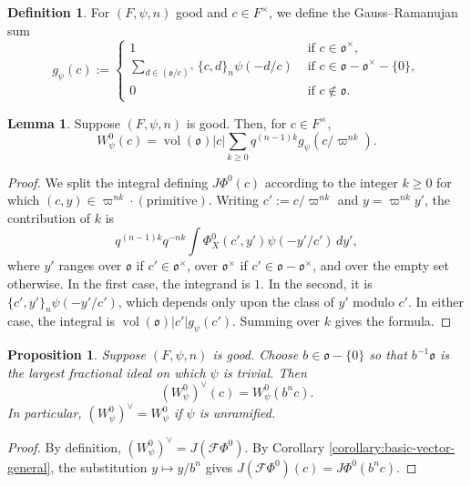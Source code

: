\documentclass[reqno]{amsart}
\DeclareMathOperator{\vol}{vol}
\theoremstyle{plain}
\newtheorem{proposition}[theorem]{Proposition}
\theoremstyle{definition}
\newtheorem{definition}[theorem]{Definition}
\theoremstyle{itplain}
\newtheorem{lemma}[theorem]{Lemma}
\numberwithin{equation}{section}
\numberwithin{theorem}{section}
\begin{document}
\begin{definition}\label{definition:gauss-ramanujan}
  For $(F, \psi, n)$ good and $c \in F^\times$, we define the Gauss--Ramanujan sum
  \begin{equation*}
    g_{\psi}(c) :=
    \begin{cases}
      1
      & \text{ if } c \in \mathfrak{o}^\times, \\
      \sum_{d \in(\mathfrak{o} / c)^\times} \{c, d\}_n \psi(- d/c)
      & \text{ if } c \in \mathfrak{o} - \mathfrak{o}^\times - \{0\}, \\
      0    
      & \text{ if } c \notin \mathfrak{o}.
    \end{cases}
  \end{equation*}
\end{definition}
\begin{lemma}\label{lemma:jacquet-basic}
  Suppose $(F, \psi, n)$ is good.  Then, for $c \in F^\times$,
  \begin{equation*}
    W_\psi^0(c) = \vol(\mathfrak{o}) \lvert c \rvert \sum_{k \geq 0} q^{(n - 1) k} g_\psi(c / \varpi^{n k}).
  \end{equation*}
\end{lemma}
\begin{proof}
  We split the integral defining $J \Phi^0(c)$ according to the integer $k \geq 0$ for which $(c, y) \in \varpi^{n k} \cdot (\text{primitive})$.  Writing $c' := c / \varpi^{n k}$ and $y = \varpi^{n k} y'$, the contribution of $k$ is
  \begin{equation*}
    q^{(n-1) k} q^{- n k} \int \Phi^0_X(c', y') \psi(- y' / c') \, d y',
  \end{equation*}
  where $y'$ ranges over $\mathfrak{o}$ if $c' \in \mathfrak{o}^\times$, over $\mathfrak{o}^\times$ if $c' \in \mathfrak{o} - \mathfrak{o}^\times$, and over the empty set otherwise.  In the first case, the integrand is $1$.  In the second, it is $\{c', y'\}_n \psi(- y'/c')$, which depends only upon the class of $y'$ modulo $c'$.  In either case, the integral is $\vol(\mathfrak{o}) \lvert c' \rvert g_\psi(c')$.  Summing over $k$ gives the formula.
\end{proof}
\begin{proposition}\label{proposition:basic-function-dual}
  Suppose $(F, \psi, n)$ is good.  Choose $b \in \mathfrak{o} - \{0\}$ so that $b^{-1} \mathfrak{o}$ is the largest fractional ideal on which $\psi$ is trivial.  Then
  \begin{equation*}
    (W_\psi^0)^\vee(c) = W^0_\psi(b^n c).
  \end{equation*}
  In particular, $(W_\psi^0)^\vee = W_\psi^0$ if $\psi$ is unramified.
\end{proposition}
\begin{proof}
  By definition, $(W_\psi^0)^\vee = J(\mathcal{F} \Phi^0)$.  By Corollary \ref{corollary:basic-vector-general}, the substitution $y \mapsto y / b^n$ gives $J(\mathcal{F} \Phi^0)(c) = J \Phi^0(b^n c)$.
\end{proof}
\end{document}
